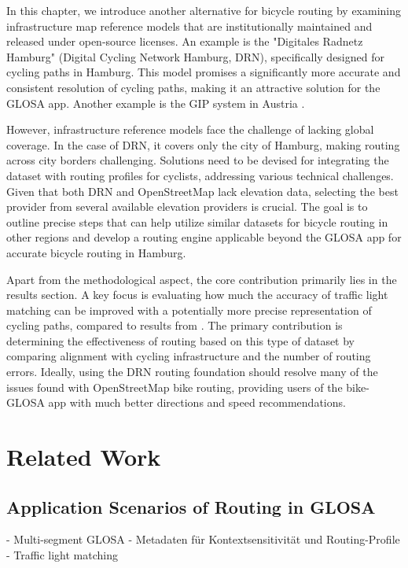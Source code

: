 In this chapter, we introduce another alternative for bicycle routing by examining infrastructure map reference models that are institutionally maintained and released under open-source licenses. An example is the "Digitales Radnetz Hamburg" (Digital Cycling Network Hamburg, DRN), specifically designed for cycling paths in Hamburg. This model promises a significantly more accurate and consistent resolution of cycling paths, making it an attractive solution for the GLOSA app. Another example is the GIP system in Austria \cite{englede2013efficient}.

However, infrastructure reference models face the challenge of lacking global coverage. In the case of DRN, it covers only the city of Hamburg, making routing across city borders challenging. Solutions need to be devised for integrating the dataset with routing profiles for cyclists, addressing various technical challenges. Given that both DRN and OpenStreetMap lack elevation data, selecting the best provider from several available elevation providers is crucial. The goal is to outline precise steps that can help utilize similar datasets for bicycle routing in other regions and develop a routing engine applicable beyond the GLOSA app for accurate bicycle routing in Hamburg.

Apart from the methodological aspect, the core contribution primarily lies in the results section. A key focus is evaluating how much the accuracy of traffic light matching can be improved with a potentially more precise representation of cycling paths, compared to results from . The primary contribution is determining the effectiveness of routing based on this type of dataset by comparing alignment with cycling infrastructure and the number of routing errors. Ideally, using the DRN routing foundation should resolve many of the issues found with OpenStreetMap bike routing, providing users of the bike-GLOSA app with much better directions and speed recommendations.

\section{Related Work}\label{sec:rw-uis}

\subsection{Application Scenarios of Routing in GLOSA}

- Multi-segment GLOSA
- Metadaten für Kontextsensitivität und Routing-Profile
- Traffic light matching

